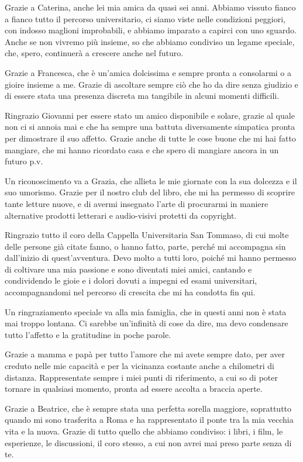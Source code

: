 Grazie a Caterina, anche lei mia amica da quasi sei anni. Abbiamo vissuto fianco a fianco tutto il percorso universitario, ci siamo viste nelle condizioni peggiori, 
con indosso maglioni improbabili, e abbiamo imparato a capirci con uno sguardo. Anche se non vivremo più insieme, so che abbiamo condiviso un legame speciale, che, spero, continuerà a crescere anche
nel futuro.

Grazie a Francesca, che è un'amica dolcissima e sempre pronta a consolarmi o a gioire insieme a me. Grazie di ascoltare sempre
ciò che ho da dire senza giudizio e di essere stata una presenza discreta ma tangibile in alcuni momenti difficili.

Ringrazio Giovanni per essere stato un amico disponibile e solare, grazie al quale non ci si annoia mai e che ha sempre una battuta diversamente simpatica pronta per dimostrare il suo affetto. 
Grazie anche di tutte le cose buone che mi hai fatto mangiare, che mi hanno ricordato casa e che spero di mangiare ancora in un futuro p.v.

Un riconoscimento va a Grazia, che allieta le mie giornate con la sua dolcezza e il suo umorismo. Grazie per il nostro club del libro, 
che mi ha permesso di scoprire tante letture nuove, e di avermi insegnato l'arte di procurarmi in maniere alternative prodotti letterari e audio-visivi
protetti da copyright.

Ringrazio tutto il coro della Cappella Universitaria San Tommaso, di cui molte delle persone già citate fanno, o hanno fatto, parte,
perché mi accompagna sin dall'inizio di quest'avventura.
Devo molto a tutti loro, poiché mi hanno permesso di coltivare una mia passione e sono diventati miei amici, cantando e condividendo le gioie 
e i dolori dovuti a impegni ed esami universitari, accompagnandomi nel percorso di crescita che mi ha condotta fin qui.

Un ringraziamento speciale va alla mia famiglia, che in questi anni non è stata mai troppo lontana. Ci sarebbe un'infinità di cose
da dire, ma devo condensare tutto l'affetto e la gratitudine in poche parole.

Grazie a mamma e papà per tutto l'amore che mi avete sempre dato, per aver creduto nelle mie capacità e 
per la vicinanza costante anche a chilometri di distanza. Rappresentate sempre i miei punti di riferimento,
a cui so di poter tornare in qualsiasi momento, pronta ad essere accolta a braccia aperte.

\clearpage
Grazie a Beatrice, che è sempre stata una perfetta sorella maggiore, soprattutto quando mi sono trasferita a Roma e 
ha rappresentato il ponte tra la mia vecchia vita e la nuova. Grazie di tutto quello che abbiamo condiviso: i libri,
i film, le esperienze, le discussioni, il coro stesso, a cui non avrei mai preso parte senza di te. 

